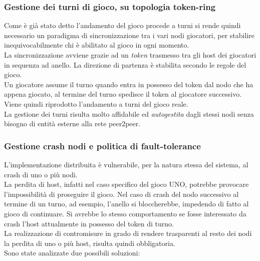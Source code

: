 \documentclass[10pt,a4paper]{article}
\begin{document}
\subsubsection{Gestione dei turni di gioco, su topologia token-ring}
Come è già stato detto l'andamento del gioco procede a turni si rende quindi necessario un paradigma di sincronizzazione tra i vari nodi giocatori, per stabilire inequivocabilmente chi è abilitato al gioco in ogni momento.\\ La sincronizzazione avviene grazie ad un \textit{token} trasmesso tra gli host dei giocatori in sequenza ad anello. La direzione di partenza è stabilita secondo le regole del gioco.\\ Un giocatore assume il turno quando entra in possesso del token dal nodo che ha appena giocato, al termine del turno spedisce il token al giocatore successivo. Viene quindi riprodotto l'andamento a turni del gioco reale.\\ 
La gestione dei turni risulta molto affidabile ed \textit{autogestita} dagli stessi nodi senza bisogno di entità esterne alla rete peer2peer.

\subsubsection{Gestione crash nodi e politica di fault-tolerance}
L'implementazione distribuita è vulnerabile, per la natura stessa del sistema, al crash di uno o più nodi. \\La perdita di host, infatti nel caso specifico del gioco UNO, potrebbe provocare l'impossibilità di proseguire il gioco. Nel caso di crash del nodo successivo al termine di un turno, ad esempio, l'anello si bloccherebbe, impedendo di fatto al gioco di continuare. Si avrebbe lo stesso comportamento se fosse interessato da crash l'host attualmente in possesso del token di turno.\\ La realizzazione di contromisure in grado di rendere trasparenti al resto dei nodi la perdita di uno o più host, risulta quindi obbligatoria. \\ Sono state analizzate due possibili soluzioni:
\end{document}
